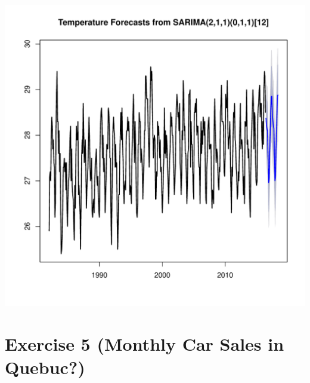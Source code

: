 \documentclass[10pt]{article}\usepackage[]{graphicx}\usepackage[]{color}
\makeatletter
\def\maxwidth{ %
  \ifdim\Gin@nat@width>\linewidth
    \linewidth
  \else
    \Gin@nat@width
  \fi
}
\newenvironment{knitrout}{}{} %
\makeatother
\begin{document}
\begin{knitrout}
\includegraphics[width=\maxwidth]{figure/unnamed-chunk-31-1} 

\end{knitrout}


\section{ Exercise 5 (Monthly Car Sales in Quebuc?)}
\end{document}
